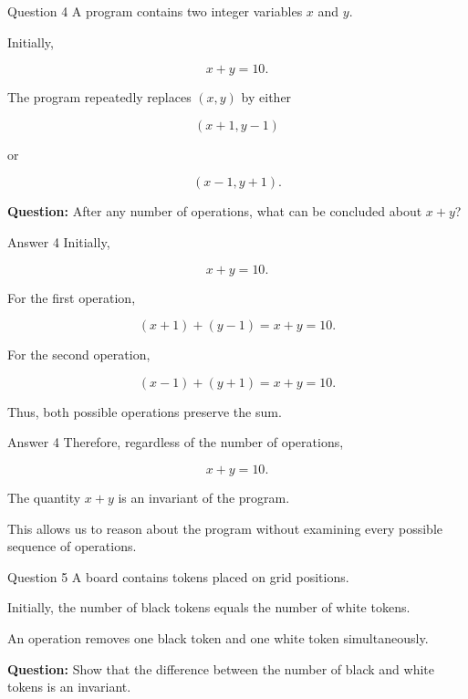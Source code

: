 
\begin{frame}{Question 4}
A program contains two integer variables $x$ and $y$.

Initially,

$$
x+y=10.
$$

The program repeatedly replaces $(x,y)$ by either

$$
(x+1,y-1)
$$

or

$$
(x-1,y+1).
$$

\textbf{Question:} After any number of operations, what can be concluded about $x+y$?
\end{frame}

\begin{frame}{Answer 4}
Initially,

$$
x+y=10.
$$

For the first operation,

$$
(x+1)+(y-1)=x+y=10.
$$

For the second operation,

$$
(x-1)+(y+1)=x+y=10.
$$

Thus, both possible operations preserve the sum.
\end{frame}

\begin{frame}{Answer 4}
Therefore, regardless of the number of operations,

$$
\boxed{x+y=10}.
$$

The quantity $x+y$ is an invariant of the program.

This allows us to reason about the program without examining every possible sequence of operations.
\end{frame}


\begin{frame}{Question 5}
A board contains tokens placed on grid positions.

Initially, the number of black tokens equals the number of white tokens.

An operation removes one black token and one white token simultaneously.

\textbf{Question:} Show that the difference between the number of black and white tokens is an invariant.
\end{frame}

